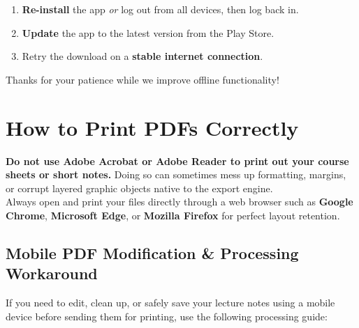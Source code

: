 \vspace{8pt}

\begin{alertbox}
  \small
  \begin{enumerate}
    \item \textbf{Re-install} the app \emph{or} log out from all devices, then
          log back in.
    \item \textbf{Update} the app to the latest version from the Play Store.
    \item Retry the download on a \textbf{stable internet connection}.
  \end{enumerate}
  \vspace{2pt}
  Thanks for your patience while we improve offline functionality!
\end{alertbox}
\section{How to Print PDFs Correctly}

\begin{alertbox}
  \small
  \textbf{Do not use Adobe Acrobat or Adobe Reader to print out your course sheets or short notes.} Doing so can sometimes mess up formatting, margins, or corrupt layered graphic objects native to the export engine.\\[4pt]
  Always open and print your files directly through a web browser such as \textbf{Google Chrome}, \textbf{Microsoft Edge}, or \textbf{Mozilla Firefox} for perfect layout retention.
\end{alertbox}

\subsection{\faMobile\enspace Mobile PDF Modification \& Processing Workaround}

If you need to edit, clean up, or safely save your lecture notes using a mobile device before sending them for printing, use the following processing guide:

